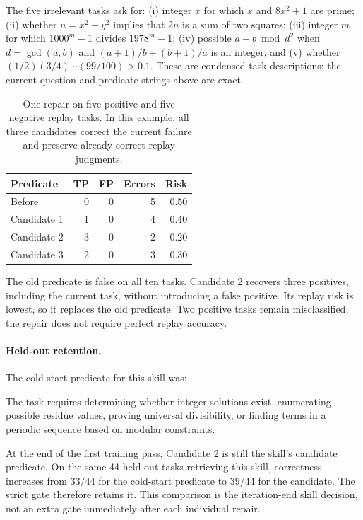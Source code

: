 The five irrelevant tasks ask for: (i) integer $x$ for which $x$ and $8x^2+1$ are prime; (ii) whether $n=x^2+y^2$ implies that $2n$ is a sum of two squares; (iii) integer $m$ for which $1000^m-1$ divides $1978^m-1$; (iv) possible $a+b\bmod d^2$ when $d=\gcd(a,b)$ and $(a+1)/b+(b+1)/a$ is an integer; and (v) whether $(1/2)(3/4)\cdots(99/100)>0.1$. These are condensed task descriptions; the current question and predicate strings above are exact.

\begin{table}[t]
\centering\small
\begin{tabular}{lrrrr}
\toprule
Predicate & TP & FP & Errors & Risk\\
\midrule
Before & 0 & 0 & 5 & 0.50\\
Candidate 1 & 1 & 0 & 4 & 0.40\\
Candidate 2 & 3 & 0 & 2 & 0.20\\
Candidate 3 & 2 & 0 & 3 & 0.30\\
\bottomrule
\end{tabular}
\caption{One repair on five positive and five negative replay tasks. In this example, all three candidates correct the current failure and preserve already-correct replay judgments.}
\label{tab:appendix-repair-trace}
\end{table}

The old predicate is false on all ten tasks. Candidate 2 recovers three positives, including the current task, without introducing a false positive. Its replay risk is lowest, so it replaces the old predicate. Two positive tasks remain misclassified; the repair does not require perfect replay accuracy.

\paragraph{Held-out retention.}
The cold-start predicate for this skill was:
\begingroup
\small\ttfamily\raggedright
The task requires determining whether integer solutions exist, enumerating possible residue values, proving universal divisibility, or finding terms in a periodic sequence based on modular constraints.
\par
\endgroup

At the end of the first training pass, Candidate 2 is still the skill's candidate predicate. On the same 44 held-out tasks retrieving this skill, correctness increases from $33/44$ for the cold-start predicate to $39/44$ for the candidate. The strict gate therefore retains it. This comparison is the iteration-end skill decision, not an extra gate immediately after each individual repair.
